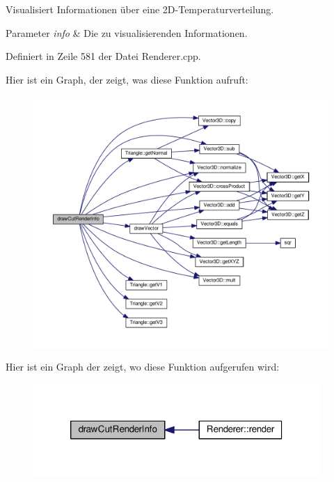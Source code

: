Visualisiert Informationen über eine 2\-D-\/\-Temperaturverteilung. 


\begin{DoxyParams}{Parameter}
{\em info} & Die zu visualisierenden Informationen. \\
\hline
\end{DoxyParams}


Definiert in Zeile 581 der Datei Renderer.\-cpp.



Hier ist ein Graph, der zeigt, was diese Funktion aufruft\-:
\nopagebreak
\begin{figure}[H]
\begin{center}
\leavevmode
\includegraphics[width=350pt]{simpleanalyzer-gui_2src_2GUI_2Renderer_8cpp_a608a02845726b8844beac12e5154c500_cgraph}
\end{center}
\end{figure}




Hier ist ein Graph der zeigt, wo diese Funktion aufgerufen wird\-:
\nopagebreak
\begin{figure}[H]
\begin{center}
\leavevmode
\includegraphics[width=308pt]{simpleanalyzer-gui_2src_2GUI_2Renderer_8cpp_a608a02845726b8844beac12e5154c500_icgraph}
\end{center}
\end{figure}


